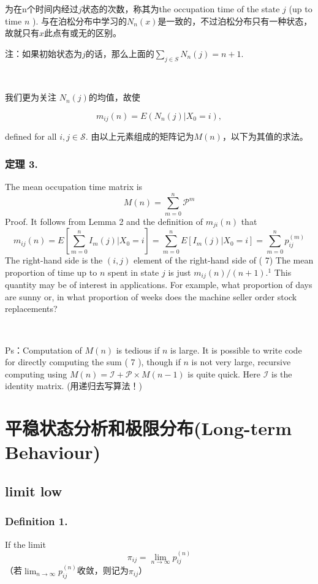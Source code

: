 \documentclass[UTF8]{ctexart}
\begin{document}
为在n个时间内经过$j$状态的次数，称其为the occupation time of the state $j$ (up to time $n$ ). 与在泊松分布中学习的$N_n(x)$是一致的，不过泊松分布只有一种状态，故就只有$x$此点有或无的区别。

注：如果初始状态为$j$的话，那么上面的$\sum_{j \in S} N_{n}(j)=n+1 .$ 

\

我们更为关注 $N_n(j)$的均值，故使

$$m_{i j}(n)=E\left(N_{n}(j) | X_{0}=i\right),$$ 

defined for all $i, j \in \mathcal{S} .$ 由以上元素组成的矩阵记为$M(n)$，以下为其值的求法。

\subsubsection{定理 3.} The mean occupation time matrix is
$$
M(n)=\sum_{m=0}^{n} \mathcal{P}^{m}
$$
Proof. It follows from Lemma 2 and the definition of $m_{ji}(n)$ that
$$
m_{i j}(n)=E\left[\sum_{m=0}^{n} I_{m}(j) | X_{0}=i\right]=\sum_{m=0}^{n} E\left[I_{m}(j) | X_{0}=i\right]=\sum_{m=0}^{n} p_{i j}^{(m)}
$$
The right-hand side is the $(i, j)$ element of the right-hand side of ( 7)
The mean proportion of time up to $n$ spent in state $j$ is just $m_{i j}(n) /(n+1) .^{1}$ This quantity may be
of interest in applications. For example, what proportion of days are sunny or, in what proportion of weeks does the machine seller order stock replacements?

\

Ps：Computation of $M(n)$ is tedious if $n$ is large. It is possible to write code for directly computing the
sum ( 7 ), though if $n$ is not very large, recursive computing using $M(n)=\mathcal{I}+\mathcal{P} \times M(n-1)$ is quite quick. Here $\mathcal{I}$ is the identity matrix.
(用递归去写算法！)

\section{平稳状态分析和极限分布(Long-term Behaviour)}

\subsection{limit low}
\subsubsection{Definition 1.} If the limit
$$
\pi_{i j}=\lim _{n \rightarrow \infty} p_{i j}^{(n)}
$$（若${\lim }_{n \rightarrow \infty} p_{i j}^{(n)}$收敛，则记为$\pi_{i j}$）
\end{document}
